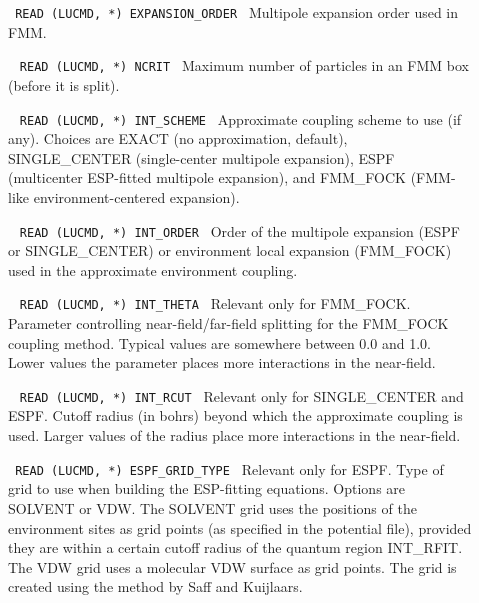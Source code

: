 \begin{description}
\item[]\verb| |\newline
\verb|READ (LUCMD, *) EXPANSION_ORDER|\verb| |\newline
Multipole expansion order used in FMM.

\item[]\verb| |\newline
\verb|READ (LUCMD, *) NCRIT|\verb| |\newline
Maximum number of particles in an FMM box (before it is split).

\item[]\verb| |\newline
\verb|READ (LUCMD, *) INT_SCHEME|\verb| |\newline
Approximate coupling scheme to use (if any). Choices are EXACT (no approximation, default), SINGLE\_CENTER (single-center multipole expansion), ESPF (multicenter ESP-fitted multipole expansion), and FMM\_FOCK (FMM-like environment-centered expansion).

\item[]\verb| |\newline
\verb|READ (LUCMD, *) INT_ORDER|\verb| |\newline
Order of the multipole expansion (ESPF or SINGLE\_CENTER) or environment local expansion (FMM\_FOCK) used in the approximate environment coupling.

\item[]\verb| |\newline
\verb|READ (LUCMD, *) INT_THETA|\verb| |\newline
Relevant only for FMM\_FOCK. Parameter controlling near-field/far-field splitting for the FMM\_FOCK coupling method. Typical values are somewhere between 0.0 and 1.0. Lower values the parameter places more interactions in the near-field.

\item[]\verb| |\newline
\verb|READ (LUCMD, *) INT_RCUT|\verb| |\newline
Relevant only for SINGLE\_CENTER and ESPF. Cutoff radius (in bohrs) beyond which the approximate coupling is used. Larger values of the radius place more interactions in the near-field.

\item[]\verb| |\newline
\verb|READ (LUCMD, *) ESPF_GRID_TYPE|\verb| |\newline
Relevant only for ESPF. Type of grid to use when building the ESP-fitting equations. Options are SOLVENT or VDW. 
The SOLVENT grid uses the positions of the environment sites as grid points (as specified in the potential file), provided they are within a certain cutoff radius of the quantum region INT\_RFIT.
The VDW grid uses a molecular VDW surface as grid points. The grid is created using the method by Saff and Kuijlaars.


\end{description}
